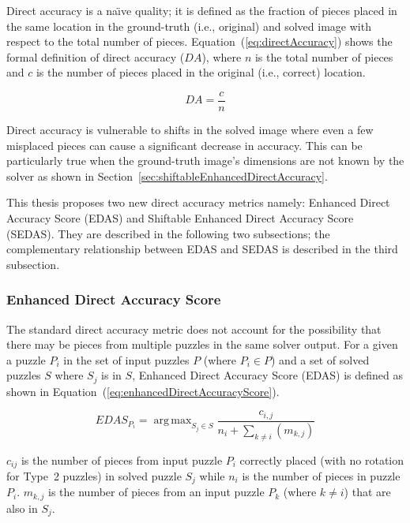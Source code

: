 \documentclass{report}
\def\eref#1{(\ref{#1})}
\DeclareMathOperator*{\argmax}{arg\,max} %
\begin{document}
Direct accuracy is a na\"{\i}ve quality; it is defined as the fraction of pieces placed in the same location in the ground-truth (i.e., original) and solved image with respect to the total number of pieces.  Equation~\eref{eq:directAccuracy} shows the formal definition of direct accuracy ($DA$), where $n$ is the total number of pieces and $c$ is the number of pieces placed in the original (i.e., correct) location.

\begin{equation} \label{eq:directAccuracy}
DA = \frac{c}{n}
\end{equation}

Direct accuracy is vulnerable to shifts in the solved image where even a few misplaced pieces can cause a significant decrease in accuracy.  This can be particularly true when the ground-truth image's dimensions are not known by the solver as shown in Section~\ref{sec:shiftableEnhancedDirectAccuracy}.

This thesis proposes two new direct accuracy metrics namely: Enhanced Direct Accuracy Score (EDAS) and Shiftable Enhanced Direct Accuracy Score (SEDAS).  They are described in the following two subsections; the complementary relationship between EDAS and SEDAS is described in the third subsection.

\subsubsection{Enhanced Direct Accuracy Score}\label{sec:enhancedDirectAccuracyScore}

The standard direct accuracy metric does not account for the possibility that there may be pieces from multiple puzzles in the same solver output.  For a given a puzzle $P_i$ in the set of input puzzles $P$ (where $P_i \in P$) and a set of solved puzzles $S$ where $S_j$ is in $S$, Enhanced Direct Accuracy Score (EDAS) is defined as shown in Equation~\eref{eq:enhancedDirectAccuracyScore}.

\begin{equation} \label{eq:enhancedDirectAccuracyScore}
EDAS_{P_i} = \argmax_{S_j \in S}\frac{c_{i,j}}{n_i + \sum_{k \ne i}(m_{k,j})}
\end{equation}

\noindent
$c_{ij}$ is the number of pieces from input puzzle $P_i$ correctly placed (with no rotation for Type~2 puzzles) in solved puzzle $S_j$ while $n_i$ is the number of pieces in puzzle $P_i$. $m_{k,j}$ is the number of pieces from an input puzzle $P_k$ (where $k \ne i$) that are also in $S_j$.
\end{document}
